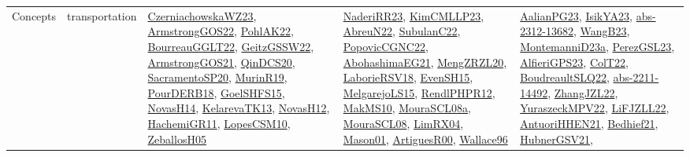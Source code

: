 {\begin{longtable}{lp{3cm}>{\raggedright}p{6cm}>{\raggedright}p{6cm}p{8cm}}
Concepts & transportation & \href{articles/CzerniachowskaWZ23.pdf}{CzerniachowskaWZ23}\cite{CzerniachowskaWZ23}, \href{papers/ArmstrongGOS22.pdf}{ArmstrongGOS22}\cite{ArmstrongGOS22}, \href{articles/PohlAK22.pdf}{PohlAK22}\cite{PohlAK22}, \href{articles/BourreauGGLT22.pdf}{BourreauGGLT22}\cite{BourreauGGLT22}, \href{papers/GeitzGSSW22.pdf}{GeitzGSSW22}\cite{GeitzGSSW22}, \href{papers/ArmstrongGOS21.pdf}{ArmstrongGOS21}\cite{ArmstrongGOS21}, \href{articles/QinDCS20.pdf}{QinDCS20}\cite{QinDCS20}, \href{articles/SacramentoSP20.pdf}{SacramentoSP20}\cite{SacramentoSP20}, \href{papers/MurinR19.pdf}{MurinR19}\cite{MurinR19}, \href{articles/PourDERB18.pdf}{PourDERB18}\cite{PourDERB18}, \href{articles/GoelSHFS15.pdf}{GoelSHFS15}\cite{GoelSHFS15}, \href{articles/NovasH14.pdf}{NovasH14}\cite{NovasH14}, \href{papers/KelarevaTK13.pdf}{KelarevaTK13}\cite{KelarevaTK13}, \href{articles/NovasH12.pdf}{NovasH12}\cite{NovasH12}, \href{articles/HachemiGR11.pdf}{HachemiGR11}\cite{HachemiGR11}, \href{articles/LopesCSM10.pdf}{LopesCSM10}\cite{LopesCSM10}, \href{articles/ZeballosH05.pdf}{ZeballosH05}\cite{ZeballosH05} & \href{articles/NaderiRR23.pdf}{NaderiRR23}\cite{NaderiRR23}, \href{papers/KimCMLLP23.pdf}{KimCMLLP23}\cite{KimCMLLP23}, \href{articles/AbreuN22.pdf}{AbreuN22}\cite{AbreuN22}, \href{articles/SubulanC22.pdf}{SubulanC22}\cite{SubulanC22}, \href{papers/PopovicCGNC22.pdf}{PopovicCGNC22}\cite{PopovicCGNC22}, \href{articles/AbohashimaEG21.pdf}{AbohashimaEG21}\cite{AbohashimaEG21}, \href{articles/MengZRZL20.pdf}{MengZRZL20}\cite{MengZRZL20}, \href{articles/LaborieRSV18.pdf}{LaborieRSV18}\cite{LaborieRSV18}, \href{papers/EvenSH15.pdf}{EvenSH15}\cite{EvenSH15}, \href{papers/MelgarejoLS15.pdf}{MelgarejoLS15}\cite{MelgarejoLS15}, \href{papers/RendlPHPR12.pdf}{RendlPHPR12}\cite{RendlPHPR12}, \href{papers/MakMS10.pdf}{MakMS10}\cite{MakMS10}, \href{papers/MouraSCL08a.pdf}{MouraSCL08a}\cite{MouraSCL08a}, \href{papers/MouraSCL08.pdf}{MouraSCL08}\cite{MouraSCL08}, \href{papers/LimRX04.pdf}{LimRX04}\cite{LimRX04}, \href{articles/Mason01.pdf}{Mason01}\cite{Mason01}, \href{articles/ArtiguesR00.pdf}{ArtiguesR00}\cite{ArtiguesR00}, \href{articles/Wallace96.pdf}{Wallace96}\cite{Wallace96} & \href{papers/AalianPG23.pdf}{AalianPG23}\cite{AalianPG23}, \href{articles/IsikYA23.pdf}{IsikYA23}\cite{IsikYA23}, \href{articles/abs-2312-13682.pdf}{abs-2312-13682}\cite{abs-2312-13682}, \href{papers/WangB23.pdf}{WangB23}\cite{WangB23}, \href{articles/MontemanniD23a.pdf}{MontemanniD23a}\cite{MontemanniD23a}, \href{papers/PerezGSL23.pdf}{PerezGSL23}\cite{PerezGSL23}, \href{articles/AlfieriGPS23.pdf}{AlfieriGPS23}\cite{AlfieriGPS23}, \href{articles/ColT22.pdf}{ColT22}\cite{ColT22}, \href{papers/BoudreaultSLQ22.pdf}{BoudreaultSLQ22}\cite{BoudreaultSLQ22}, \href{articles/abs-2211-14492.pdf}{abs-2211-14492}\cite{abs-2211-14492}, \href{papers/ZhangJZL22.pdf}{ZhangJZL22}\cite{ZhangJZL22}, \href{articles/YuraszeckMPV22.pdf}{YuraszeckMPV22}\cite{YuraszeckMPV22}, \href{papers/LiFJZLL22.pdf}{LiFJZLL22}\cite{LiFJZLL22}, \href{papers/AntuoriHHEN21.pdf}{AntuoriHHEN21}\cite{AntuoriHHEN21}, \href{articles/Bedhief21.pdf}{Bedhief21}\cite{Bedhief21}, \href{articles/HubnerGSV21.pdf}{HubnerGSV21}\cite{HubnerGSV21}, 
\end{longtable}}
